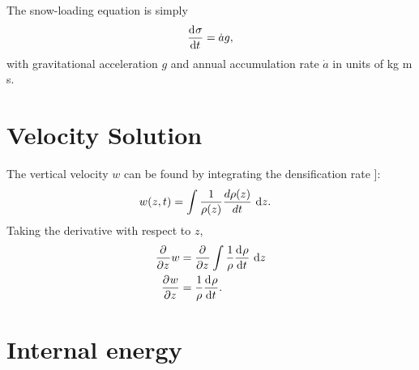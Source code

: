 The snow-loading equation is simply
\begin{align}
  \frac{\mathrm{d}^{} \sigma}{\mathrm{d} t^{} } = \dot{a} g,
\end{align}
with gravitational acceleration $g$ and annual accumulation rate $\dot{a}$ in units of kg m s.



\section{Velocity Solution}

The vertical velocity $w$ can be found by integrating the densification rate \citep{zwally_2002}]:
\begin{align*}
  w(z,t) &= \int \frac{1}{\rho(z)} \frac{d\rho(z)}{dt} \ \mathrm{d}z.
\end{align*}
Taking the derivative with respect to $z$,
\begin{align}
  \frac{\partial^{} }{\partial z^{} } w &= \frac{\partial^{} }{\partial z^{} } \int \frac{1}{\rho} \frac{\mathrm{d}^{} \rho}{\mathrm{d} t^{} } \ \mathrm{d}z \notag \\
  \frac{\partial^{} w}{\partial z^{} } &= \frac{1}{\rho} \frac{\mathrm{d}^{} \rho}{\mathrm{d} t^{} }.
\end{align}


\section{Internal energy}

